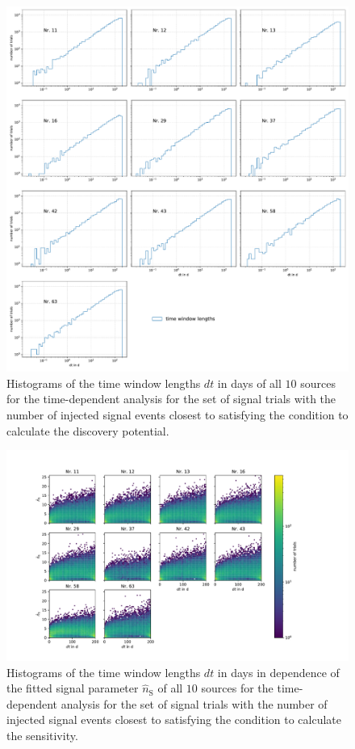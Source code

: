 \begin{figure}
    \centering
    \includegraphics[width=\linewidth]{Plots/appendix/9_years_gfu_gold_time_dep_disc_dt.pdf}
    \caption{Histograms of the time window lengths $dt$ in days of all $\num{10}$ sources for the time-dependent analysis for the set of signal trials with the number of injected signal events closest to satisfying the condition to calculate the discovery potential.}
    \label{fig:disc_dt_all}
\end{figure}

\begin{figure}
    \centering
    \includegraphics[width=16cm]{Plots/appendix/time_window_ns_sens_time_dep.pdf}
    \caption{Histograms of the time window lengths $dt$ in days in dependence of the fitted signal parameter $\hat{n}_\text{S}$ of all $\num{10}$ sources for the time-dependent analysis for the set of signal trials with the number of injected signal events closest to satisfying the condition to calculate the sensitivity.}
    \label{fig:sens_ns_dt_all}
\end{figure}

